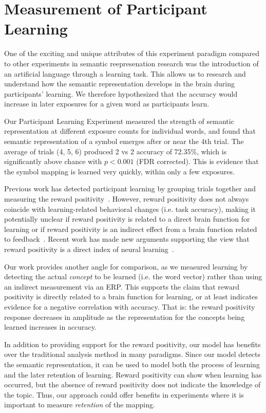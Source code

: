 \section{Measurement of Participant Learning}
One of the exciting and unique attributes of this experiment paradigm compared 
to other experiments in semantic reepresenation research was the introduction 
of an artificial language through a learning task. This allows us to research 
and understand how the semantic representation develops in the brain during 
participants' learning. We therefore hypothesized that the \tvt accuracy would 
increase in later exposures for a given word as participants learn.

Our Participant Learning Experiment measured the strength of semantic 
representation at different exposure counts for individual words, and found 
that semantic representation of a symbol emerges after or near the 4th trial.  
The average of trials (4, 5, 6) produced 2 vs 2 accuracy of 72.35\%, which is 
significantly above chance with $p < 0.001$ (FDR corrected). This is evidence 
that the symbol mapping is learned very quickly, within only a few exposures. 

Previous work has detected participant learning by grouping trials together and 
measuring the reward positivity~\cite{krigolson2014we}. However, reward 
positivity does not always coincide with learning-related behavioral changes 
(i.e. task accuracy), making it potentially unclear if reward positivity is 
related to a direct brain function for learning or if reward positivity is an 
indirect effect from a brain function related to 
feedback~\cite{walsh2012learning}. Recent work has made new arguments 
supporting the view that reward positivity is a direct index of neural 
learning~\cite{williams2017application}. 

Our work provides another angle for comparison, as we measured learning by 
detecting the actual \emph{concept} to be learned (i.e. the word vector) rather 
than using an indirect measurement via an ERP. This supports the claim that 
reward positivity is directly related to a brain function for learning, or at 
least indicates evidence for a negative correlation with \tvt accuracy. That 
is: the reward positivity response decreases in amplitude as the representation 
for the concepts being learned increases in \tvt accuracy.

In addition to providing support for the reward positivity, our model has 
benefits over the traditional analysis method in many paradigms. Since our 
model detects the semantic representation, it can be used to model both the 
process of learning and the later retention of learning.  Reward positivity can 
show when learning has occurred, but the absence of reward positivity does not 
indicate the knowledge of the topic.  Thus, our approach could offer benefits 
in experiments where it is important to measure \emph{retention} of the 
mapping.

